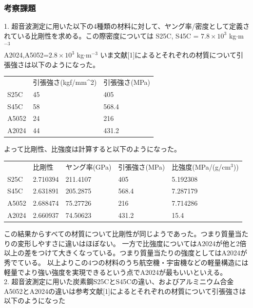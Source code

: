 \documentclass[uplatex,dvipdfmx,titlepage]{jsarticle}
\begin{document}
\subsubsection*{考察課題}
1. 超音波測定に用いた以下の4種類の材料に対して、ヤング率/密度として定義されている比剛性を求める。この際密度については
S25C, S45C = $7.8 \times 10^3$ kg$\cdot$m$^{-3}$ \\
A2024,A5052=$2.8 \times 10^3$ kg$\cdot$m$^{-3}$
いま文献[1]によるとそれぞれの材質について引張強さは以下のようになった。
\begin{table}[H]
\begin{tabular}{lll}
      & 引張強さ(kgf/mm\textasciicircum{}2) & 引張強さ(MPa) \\
S25C  & 45                              & 405       \\
S45C  & 58                              & 568.4     \\
A5052 & 24                              & 216       \\
A2024 & 44                              & 431.2    
\end{tabular}
\end{table}
よって比剛性、比強度は計算すると以下のようになった。
\begin{table}[H]
\begin{tabular}{lllll}
      & 比剛性      & ヤング率(GPa)   & 引張強さ(MPa)  & 比強度(MPa/(g/cm$^3$))    \\
S25C  & 2.710394 & 211.4107 & 405   & 5.192308 \\
S45C  & 2.631891 & 205.2875 & 568.4 & 7.287179 \\
A5052 & 2.688474 & 75.27726 & 216   & 7.714286 \\
A2024 & 2.660937 & 74.50623 & 431.2 & 15.4    
\end{tabular}
\end{table}
この結果からすべての材質について比剛性が同じようであった。つまり質量当たりの変形しやすさに違いはほぼない。
一方で比強度についてはA2024が他と2倍以上の差をつけて大きくなっている。つまり質量当たりの強度としてはA2024が秀でている。
以上よりこの4つの材料のうち航空機・宇宙機などの軽量構造には軽量でより強い強度を実現できるという点でA2024が最もいいといえる。\\
2. 超音波測定に用いた炭素鋼S25CとS45Cの違い、およびアルミニウム合金A5052とA2024の違いは参考文献[1]によるとそれぞれの材質について引張強さは以下のようになった
\end{document}
